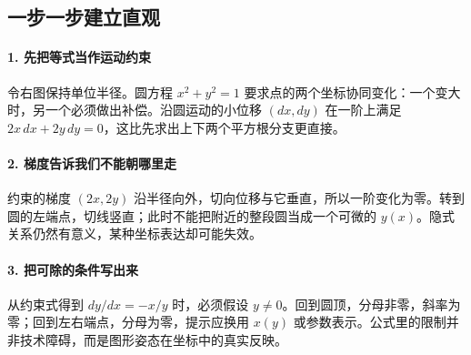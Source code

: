 \subsection*{一步一步建立直观}

\paragraph{1. 先把等式当作运动约束}

令右图保持单位半径。圆方程 $x^2+y^2=1$ 要求点的两个坐标协同变化：一个变大时，另一个必须做出补偿。沿圆运动的小位移 $(dx,dy)$ 在一阶上满足 $2x\,dx+2y\,dy=0$，这比先求出上下两个平方根分支更直接。



\paragraph{2. 梯度告诉我们不能朝哪里走}

约束的梯度 $(2x,2y)$ 沿半径向外，切向位移与它垂直，所以一阶变化为零。转到圆的左端点，切线竖直；此时不能把附近的整段圆当成一个可微的 $y(x)$。隐式关系仍然有意义，某种坐标表达却可能失效。



\paragraph{3. 把可除的条件写出来}

从约束式得到 $dy/dx=-x/y$ 时，必须假设 $y\ne0$。回到圆顶，分母非零，斜率为零；回到左右端点，分母为零，提示应换用 $x(y)$ 或参数表示。公式里的限制并非技术障碍，而是图形姿态在坐标中的真实反映。
